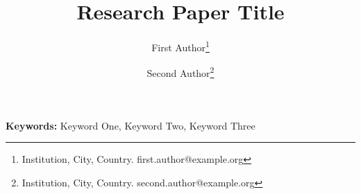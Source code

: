 \documentclass[11pt]{article}
\title{Research Paper Title}
\author{First Author\thanks{Institution, City, Country. first.author@example.org}
  \and Second Author\thanks{Institution, City, Country. second.author@example.org}}
\date{}
\begin{document}
\maketitle

\begin{abstract}

\end{abstract}

\noindent\textbf{Keywords:} Keyword One, Keyword Two, Keyword Three





\end{document}
